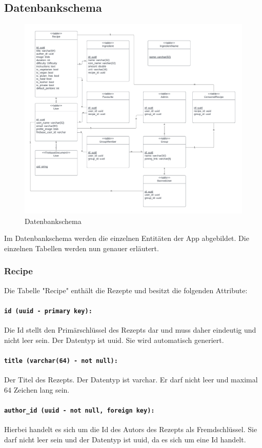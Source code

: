 \documentclass{entwurfsheft}
\begin{document}
\subsection{Datenbankschema}
\begin{figure}[htp]
    \centering
    \includegraphics[width = \linewidth]{images/database/databaseSchema.pdf}
    \caption{Datenbankschema}
\end{figure}
Im Datenbankschema werden die einzelnen Entitäten der App abgebildet. Die einzelnen Tabellen werden nun genauer erläutert.
\newpage
\subsubsection{Recipe}
Die Tabelle "Recipe" enthält die Rezepte und besitzt die folgenden Attribute:
\paragraph{\texttt{id (uuid - primary key):}} Die Id stellt den Primärschlüssel des Rezepts dar und muss daher eindeutig und nicht leer sein. Der Datentyp ist \Gls{uuid}. Sie wird automatisch generiert.
\paragraph{\texttt{title (varchar(64) - not null):}} Der Titel des Rezepts. Der Datentyp ist \Gls{varchar}. Er darf nicht leer und maximal 64 Zeichen lang sein.
\paragraph{\texttt{author\_id (uuid - not null, foreign key):}} Hierbei handelt es sich um die Id des Autors des Rezepts als Fremdschlüssel. Sie darf nicht leer sein und der Datentyp ist \Gls{uuid}, da es sich um eine Id handelt.
\end{document}
